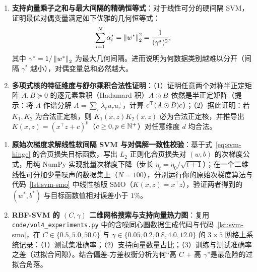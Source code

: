 
\begin{enumerate}[label=\textbf{4.\arabic*}, resume]
  \item \textbf{支持向量乘子之和与最大间隔的精确恒等式}：对于线性可分的硬间隔 SVM，证明最优对偶变量满足如下优雅的几何恒等式：
  \[
    \sum_{i=1}^{N} \alpha_i^* = \left\|w^*\right\|_2^2 = \frac{1}{(\gamma^*)^2},
  \]
  其中 $\gamma^* = 1/\left\|w^*\right\|_2$ 为最大几何间隔。进而说明为何数据类别越难以分开（间隔 $\gamma^*$ 越小），对偶变量总和必然越大。

  \item \textbf{多项式核的特征维度与舒尔乘积合法性证明}：（1）证明任意两个对称半正定矩阵 $A, B \succeq 0$ 的逐元素乘积（Hadamard 积）$A \odot B$ 依然是半正定矩阵（提示：将 $A$ 作谱分解 $A = \sum_r \lambda_r u_r u_r^\top$，计算 $c^\top (A \odot B) c$）；（2）据此证明：若 $K_1, K_2$ 为合法正定核，则 $K_1(x, z) K_2(x, z)$ 必为合法正定核，并推导出 $K(x, z) = (x^\top z + c)^p$（$c \ge 0, p \in \mathbb{N}^+$）对任意维度 $d$ 均合法。
\end{enumerate}


\begin{enumerate}[label=\textbf{4.\arabic*}, resume]
  \item \textbf{原始次梯度求解线性软间隔 SVM 与对偶解一致性校验}：基于式~\eqref{eq:svm-hinge} 的合页损失目标函数，写出 $L_2$ 正则化合页损失对 $(w, b)$ 的次梯度公式，用纯 NumPy 实现批量次梯度下降（步长 $\eta_t = \eta_0 / \sqrt{t+1}$）；在一个二维线性可分加少量噪声的数据集上（$N=100$），分别运行你的原始次梯度算法与代码~\ref{lst:svm-smo} 中线性核版 SMO（$K(x, z) = x^\top z$），验证两者得到的 $(w^*, b^*)$ 与目标函数值相对误差小于 $1\%$。

  \item \textbf{RBF-SVM 的 $(C, \gamma)$ 二维网格搜索与支持向量热力图}：复用 \texttt{code/\allowbreak vol4\_experiments.py} 中的含噪同心圆数据生成代码与代码~\ref{lst:svm-smo}，在 $C \in \{0.5, 5.0, 50.0\}$ 与 $\gamma \in \{0.05, 0.2, 0.8, 4.0, 12.0\}$ 的 $3 \times 5$ 网格上系统记录：（1）测试集准确率；（2）支持向量数量占比；（3）训练与测试准确率之差（过拟合间隙）。结合偏差-方差权衡分析为何“高 $C$ + 高 $\gamma$”是最危险的过拟合角落。
\end{enumerate}
